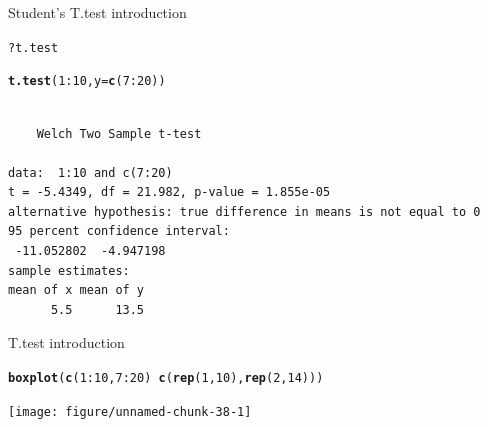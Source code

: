 \documentclass[10pt]{beamer}\usepackage[]{graphicx}\usepackage[]{color}
\makeatletter
\newcommand{\hlnum}[1]{\textcolor[rgb]{0.686,0.059,0.569}{#1}}%
\newcommand{\hlopt}[1]{\textcolor[rgb]{0,0,0}{#1}}%
\newcommand{\hlstd}[1]{\textcolor[rgb]{0.345,0.345,0.345}{#1}}%
\newcommand{\hlkwc}[1]{\textcolor[rgb]{0.333,0.667,0.333}{#1}}%
\newcommand{\hlkwd}[1]{\textcolor[rgb]{0.737,0.353,0.396}{\textbf{#1}}}%
\newenvironment{kframe}{%
 \def\at@end@of@kframe{}%
 \ifinner\ifhmode%
  \def\at@end@of@kframe{\end{minipage}}%
  \begin{minipage}{\columnwidth}%
 \fi\fi%
 \def\FrameCommand##1{\hskip\@totalleftmargin \hskip-\fboxsep
 \colorbox{shadecolor}{##1}\hskip-\fboxsep
     \hskip-\linewidth \hskip-\@totalleftmargin \hskip\columnwidth}%
 \MakeFramed {\advance\hsize-\width
   \@totalleftmargin\z@ \linewidth\hsize
   \@setminipage}}%
 {\par\unskip\endMakeFramed%
 \at@end@of@kframe}
\newenvironment{knitrout}{}{} %
\makeatother
\begin{document}
\begin{frame}[fragile]{Student's T.test introduction}%
\begin{knitrout}
\color{fgcolor}\begin{kframe}
\begin{alltt}
\hlopt{?}\hlstd{t.test}
\end{alltt}
\end{kframe}
\end{knitrout}

  \pause
\begin{knitrout}
\color{fgcolor}\begin{kframe}
\begin{alltt}
\hlkwd{t.test}\hlstd{(}\hlnum{1}\hlopt{:}\hlnum{10}\hlstd{,} \hlkwc{y} \hlstd{=} \hlkwd{c}\hlstd{(}\hlnum{7}\hlopt{:}\hlnum{20}\hlstd{))}
\end{alltt}
\begin{verbatim}

	Welch Two Sample t-test

data:  1:10 and c(7:20)
t = -5.4349, df = 21.982, p-value = 1.855e-05
alternative hypothesis: true difference in means is not equal to 0
95 percent confidence interval:
 -11.052802  -4.947198
sample estimates:
mean of x mean of y 
      5.5      13.5 
\end{verbatim}
\end{kframe}
\end{knitrout}

\end{frame}

\begin{frame}[fragile]{T.test introduction}%

\begin{knitrout}
\color{fgcolor}\begin{kframe}
\begin{alltt}
  \hlkwd{boxplot}\hlstd{(}\hlkwd{c}\hlstd{(}\hlnum{1}\hlopt{:}\hlnum{10}\hlstd{,} \hlnum{7}\hlopt{:}\hlnum{20}\hlstd{)} \hlopt{~} \hlkwd{c}\hlstd{(}\hlkwd{rep}\hlstd{(}\hlnum{1}\hlstd{,}\hlnum{10}\hlstd{),} \hlkwd{rep}\hlstd{(}\hlnum{2}\hlstd{,} \hlnum{14}\hlstd{)))}
\end{alltt}
\end{kframe}
\texttt{[image: figure/unnamed-chunk-38-1]} 

\end{knitrout}
\end{frame}
\end{document}
